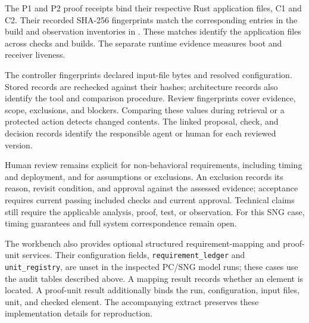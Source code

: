The P1 and P2 proof receipts bind their respective Rust application files, C1 and C2. Their recorded SHA-256 fingerprints match the corresponding entries in the build and observation inventories in . These matches identify the application files across checks and builds. The separate runtime evidence measures boot and receiver liveness.

The controller fingerprints declared input-file bytes and resolved configuration. Stored records are rechecked against their hashes; architecture records also identify the tool and comparison procedure. Review fingerprints cover evidence, scope, exclusions, and blockers. Comparing these values during retrieval or a protected action detects changed contents. The linked proposal, check, and decision records identify the responsible agent or human for each reviewed version.

Human review remains explicit for non-behavioral requirements, including timing and deployment, and for assumptions or exclusions. An exclusion records its reason, revisit condition, and approval against the assessed evidence; acceptance requires current passing included checks and current approval. Technical claims still require the applicable analysis, proof, test, or observation. For this SNG case, timing guarantees and full system correspondence remain open.

The workbench also provides optional structured requirement-mapping and proof-unit services. Their configuration fields, \texttt{requirement\_ledger} and \texttt{unit\_registry}, are unset in the inspected PC/SNG model runs; these cases use the audit tables described above. A mapping result records whether an element is located. A proof-unit result additionally binds the run, configuration, input files, unit, and checked element. The accompanying extract preserves these implementation details for reproduction.
